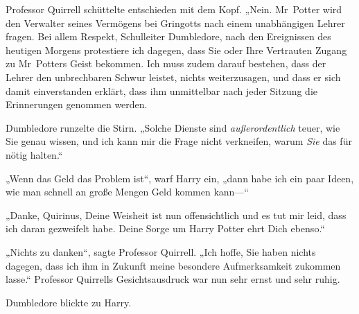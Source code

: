 Professor Quirrell schüttelte entschieden mit dem Kopf. „Nein. Mr~Potter wird den Verwalter seines Vermögens bei Gringotts nach einem unabhängigen Lehrer fragen. Bei allem Respekt, Schulleiter Dumbledore, nach den Ereignissen des heutigen Morgens protestiere ich dagegen, dass Sie oder Ihre Vertrauten Zugang zu Mr~Potters Geist bekommen. Ich muss zudem darauf bestehen, dass der Lehrer den unbrechbaren Schwur leistet, nichts weiterzusagen, und dass er sich damit einverstanden erklärt, dass ihm unmittelbar nach jeder Sitzung die Erinnerungen genommen werden.

Dumbledore runzelte die Stirn. „Solche Dienste sind \emph{außerordentlich} teuer, wie Sie genau wissen, und ich kann mir die Frage nicht verkneifen, warum \emph{Sie} das für nötig halten.“

„Wenn das Geld das Problem ist“, warf Harry ein, „dann habe ich ein paar Ideen, wie man schnell an große Mengen Geld kommen kann—“

„Danke, Quirinus, Deine Weisheit ist nun offensichtlich und es tut mir leid, dass ich daran gezweifelt habe. Deine Sorge um Harry Potter ehrt Dich ebenso.“

„Nichts zu danken“, sagte Professor Quirrell. „Ich hoffe, Sie haben nichts dagegen, dass ich ihm in Zukunft meine besondere Aufmerksamkeit zukommen lasse.“ Professor Quirrells Gesichtsausdruck war nun sehr ernst und sehr ruhig.

Dumbledore blickte zu Harry.

